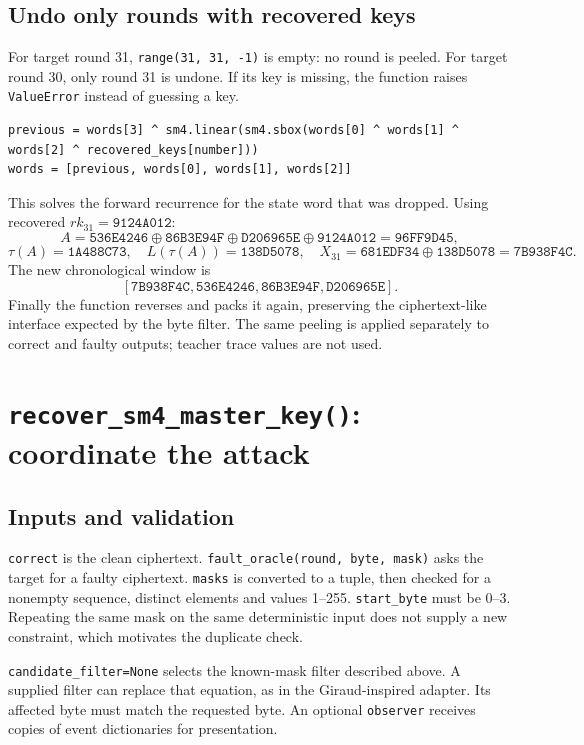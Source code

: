 \documentclass[11pt,a4paper]{article}
\newcommand{\hx}[1]{\texttt{#1}}
\newcommand{\hex}[1]{\texttt{#1}}
\newcommand{\xor}{\mathbin{\oplus}}
\begin{document}
\subsection{Undo only rounds with recovered keys}
For target round 31, \hx{range(31, 31, -1)} is empty: no round is peeled.
For target round 30, only round 31 is undone. If its key is missing,
the function raises \hx{ValueError} instead of guessing a key.
\begin{Verbatim}
previous = words[3] ^ sm4.linear(sm4.sbox(words[0] ^ words[1] ^ words[2] ^ recovered_keys[number]))
words = [previous, words[0], words[1], words[2]]
\end{Verbatim}
This solves the forward recurrence for the state word that was dropped.
Using recovered $rk_{31}=\hex{9124A012}$:
\[
A=\hex{536E4246}\xor\hex{86B3E94F}\xor\hex{D206965E}
\xor\hex{9124A012}=\hex{96FF9D45},
\]
\[
\tau(A)=\hex{1A488C73},\quad L(\tau(A))=\hex{138D5078},\quad
X_{31}=\hex{681EDF34}\xor\hex{138D5078}=\hex{7B938F4C}.
\]
The new chronological window is
\[
[\hex{7B938F4C},\hex{536E4246},\hex{86B3E94F},\hex{D206965E}].
\]
Finally the function reverses and packs it again, preserving the ciphertext-like
interface expected by the byte filter. The same peeling is applied separately
to correct and faulty outputs; teacher trace values are not used.

\section{\texorpdfstring{\texttt{recover\_sm4\_master\_key()}}{recover_sm4_master_key}: coordinate the attack}
\subsection{Inputs and validation}
\hx{correct} is the clean ciphertext. \hx{fault\_oracle(round, byte, mask)} asks
the target for a faulty ciphertext. \hx{masks} is converted to a tuple, then
checked for a nonempty sequence, distinct elements and values 1--255.
\hx{start\_byte} must be 0--3. Repeating the same mask on the same deterministic
input does not supply a new constraint, which motivates the duplicate check.

\hx{candidate\_filter=None} selects the known-mask filter described above.
A supplied filter can replace that equation, as in the Giraud-inspired adapter.
Its affected byte must match the requested byte. An optional \hx{observer}
receives copies of event dictionaries for presentation.
\end{document}
